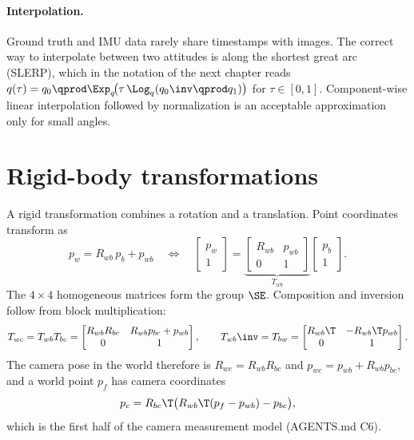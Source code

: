 \paragraph{Interpolation.} Ground truth and IMU data rarely share timestamps with images. The correct
way to interpolate between two attitudes is along the shortest great arc (SLERP), which in the notation
of the next chapter reads
$q(\tau) = q_0 \qprod \Exp_q\!\big(\tau\,\Log_q(q_0\inv\qprod q_1)\big)$ for $\tau\in[0,1]$.
Component-wise linear interpolation followed by normalization is an acceptable approximation only for
small angles.

\section{Rigid-body transformations}

A rigid transformation combines a rotation and a translation. Point coordinates transform as
\begin{equation}
  p_w = R_{wb}\,p_b + p_{wb}
  \quad\Longleftrightarrow\quad
  \begin{bmatrix} p_w \\ 1 \end{bmatrix} = \underbrace{\begin{bmatrix} R_{wb} & p_{wb} \\ 0 & 1 \end{bmatrix}}_{T_{wb}}
  \begin{bmatrix} p_b \\ 1 \end{bmatrix}.
\end{equation}
The $4\times4$ homogeneous matrices form the group $\SE$. Composition and inversion follow from block
multiplication:
\begin{equation}
  T_{wc} = T_{wb}T_{bc} = \begin{bmatrix} R_{wb}R_{bc} & R_{wb}p_{bc} + p_{wb} \\ 0 & 1\end{bmatrix},
  \qquad
  T_{wb}\inv = T_{bw} = \begin{bmatrix} R_{wb}\T & -R_{wb}\T p_{wb} \\ 0 & 1 \end{bmatrix}.
  \label{eq:se3-compose}
\end{equation}
The camera pose in the world therefore is $R_{wc} = R_{wb}R_{bc}$ and $p_{wc} = p_{wb} + R_{wb}p_{bc}$, and
a world point $p_f$ has camera coordinates
\begin{equation}
  p_c = R_{bc}\T\big(R_{wb}\T(p_f - p_{wb}) - p_{bc}\big),
  \label{eq:world-to-camera}
\end{equation}
which is the first half of the camera measurement model (AGENTS.md C6).

